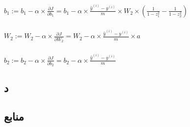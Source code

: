 \documentclass{article}
\begin{document}
\subsubsection{}
\begin{latin}
$
b_1 := b_1 - \alpha \times \frac{\partial J}{\partial b_1}
= b_1 - \alpha \times \frac{\hat{y} ^ {\left( i \right)} - y ^ {\left( i \right)}}{m} \times W_2 \times \left( \frac{1}{1-z_1 ^ 2}  - \frac{1}{1 - z_2 ^ 2} \right)
$
\end{latin}

\subsubsection{}
\begin{latin}
$
W_2 := W_2 - \alpha \times \frac{\partial J}{\partial W_2}
= W_2 - \alpha \times \frac{\hat{y} ^ {\left( i \right)} - y ^ {\left( i \right)}}{m} \times a
$
\end{latin}

\subsubsection{}
\begin{latin}
$
b_2 := b_2 - \alpha \times \frac{\partial J}{\partial b_2}
= b_2 - \alpha \times \frac{\hat{y} ^ {\left( i \right)} - y ^ {\left( i \right)}}{m}
$
\end{latin}

\subsection{د}








%





\subsection*{منابع}
\renewcommand{\subsection}[2]{}%
\begin{thebibliography}{99} %


\begin{LTRitems}

\resetlatinfont

\end{LTRitems}

\end{thebibliography}
\end{document}
